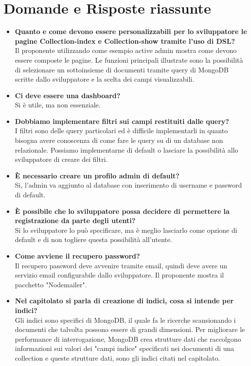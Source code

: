 \section{Domande e Risposte riassunte}
	\begin{itemize} 
		\item 
		{\bfseries Quanto e come devono essere personalizzabili per lo sviluppatore le pagine Collection-index
		e Collection-show tramite l'uso di DSL?} \\
		Il proponente utilizzando come esempio active admin mostra come devono essere composte le pagine.
		Le funzioni principali illustrate sono la possibilità di selezionare un sottoinsieme di documenti tramite query di MongoDB scritte
		dallo sviluppatore e la scelta dei campi visualizzabili.	
		
		\item 
		{\bfseries Ci deve essere una dashboard?} \\
		Si è utile, ma non essenziale. 
		
		\item
		{\bfseries Dobbiamo implementare filtri sui campi restituiti dalle query?} \\
		I filtri sono delle query particolari ed è difficile implementarli in quanto bisogna avere conoscenza di come fare le query su di un database non relazionale.
		Possiamo implementarne di default o lasciare la possibilità allo sviluppatore di creare dei filtri.
		
		\item
		{\bfseries È necessario creare un profilo admin di default?} \\
		Si, l'admin va aggiunto al database con inserimento di username e password di default.
		
		\item
		{\bfseries È possibile che lo sviluppatore possa decidere di permettere la registrazione da parte degli utenti?} \\
		 Si lo sviluppatore lo può specificare, ma è meglio lasciarlo come opzione di default e di non togliere questa possibilità
		 all'utente.
		
		\item
		{\bfseries Come avviene il recupero password?} \\
		Il recupero password deve avvenire tramite email, quindi \ProjectName{} deve avere un servizio email configurabile dallo sviluppatore.
		Il proponente mostra il pacchetto "Nodemailer".
		
		\item
		{\bfseries Nel capitolato si parla di creazione di indici, cosa si intende per indici?} \\
		Gli indici sono specifici di MongoDB, il quale fa le ricerche scansionando i documenti che talvolta possono essere di grandi dimensioni. Per migliorare le performance di interrogazione, MongoDB crea strutture dati che raccolgono informazioni sui valori dei "campi indice" specificati nei documenti di una collection e queste strutture dati, sono gli indici citati nel capitolato.
		

\end{itemize}
